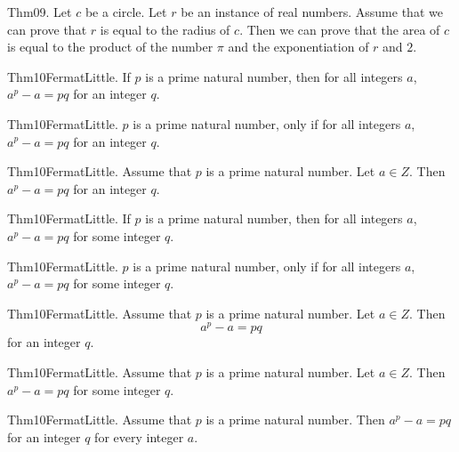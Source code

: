 \documentclass{article}
\begin{document}
Thm09. Let $c$ be a circle. Let $r$ be an instance of real numbers. Assume that we can prove that $r$ is equal to the radius of $c$. Then we can prove that the area of $c$ is equal to the product of the number \(\pi\) and the exponentiation of $r$ and $2$.

Thm10FermatLittle. If $p$ is a prime natural number, then for all integers $a$, $a ^ {p}- a = p q$ for an integer $q$.

Thm10FermatLittle. $p$ is a prime natural number, only if for all integers $a$, $a ^ {p}- a = p q$ for an integer $q$.

Thm10FermatLittle. Assume that $p$ is a prime natural number. Let $a \in Z$. Then $a ^ {p}- a = p q$ for an integer $q$.

Thm10FermatLittle. If $p$ is a prime natural number, then for all integers $a$, $a ^ {p}- a = p q$ for some integer $q$.

Thm10FermatLittle. $p$ is a prime natural number, only if for all integers $a$, $a ^ {p}- a = p q$ for some integer $q$.

Thm10FermatLittle. Assume that $p$ is a prime natural number. Let $a \in Z$. Then $$a ^ {p}- a = p q$$ for an integer $q$.

Thm10FermatLittle. Assume that $p$ is a prime natural number. Let $a \in Z$. Then $a ^ {p}- a = p q$ for some integer $q$.

Thm10FermatLittle. Assume that $p$ is a prime natural number. Then $a ^ {p}- a = p q$ for an integer $q$ for every integer $a$.
\end{document}
